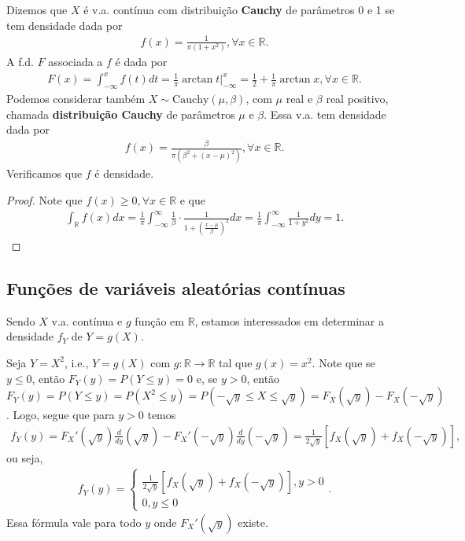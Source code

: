 \documentclass[../Notas.tex]{subfiles}
\begin{document}
\begin{example}
Dizemos que $X$ é v.a. contínua com distribuição \textbf{Cauchy} de parâmetros 0 e 1 se tem densidade dada por
\begin{align*}
    f(x) = \frac{1}{\pi(1+x^2)}, \forall x\in\mathbb{R}.
\end{align*}
A f.d. $F$ associada a $f$ é dada por
\begin{align*}
    F(x) = \int_{-\infty}^x f(t) dt = \frac{1}{\pi}\arctan t\Big|_{-\infty}^{x} = \frac{1}{2} + \frac{1}{\pi}\arctan x, \forall x\in\mathbb{R}.
\end{align*}
Podemos considerar também $X\sim\text{Cauchy}(\mu, \beta)$, com $\mu$ real e $\beta$ real positivo, chamada \textbf{distribuição Cauchy} de parâmetros $\mu$ e $\beta$. Essa v.a. tem densidade dada por
\begin{align*}
    f(x) = \frac{\beta}{\pi(\beta^2 + (x-\mu)^2)}, \forall x\in\mathbb{R}.
\end{align*}
Verificamos que $f$ é densidade.
\begin{proof}
Note que $f(x) \geq 0, \forall x\in\mathbb{R}$ e que
\begin{align*}
    \int_{\mathbb{R}} f(x) dx = \frac{1}{\pi}\int_{-\infty}^{\infty} \frac{1}{\beta}\cdot\frac{ 1 }{ 1 + \left( \frac{x-\mu}{\beta} \right)^2 } dx = \frac{1}{\pi}\int_{-\infty}^{\infty} \frac{1}{1+y^2} dy = 1.
\end{align*}
\end{proof}
\end{example}

\subsection{Funções de variáveis aleatórias contínuas}
Sendo $X$ v.a. contínua e $g$ função em $\mathbb{R}$, estamos interessados em determinar a densidade $f_Y$ de $Y = g(X)$.

\begin{example}
Seja $Y = X^2$, i.e., $Y = g(X)$ com $g:\mathbb{R}\to\mathbb{R}$ tal que $g(x) = x^2$. Note que se $y\leq 0$, então $F_Y(y) = P(Y\leq y) = 0$ e, se $y>0$, então $F_Y(y) = P(Y\leq y) = P(X^2\leq y) = P(-\sqrt{y} \leq X\leq \sqrt{y}) = F_X(\sqrt{y}) - F_X(-\sqrt{y})$. Logo, segue que para $y>0$ temos
\begin{align*}
    f_Y(y) = F_X'(\sqrt{y})\frac{d}{dy}(\sqrt{y}) - F_X'(-\sqrt{y})\frac{d}{dy}(-\sqrt{y}) = \frac{1}{2\sqrt{y}}[f_X(\sqrt{y}) + f_X(-\sqrt{y})],
\end{align*}
ou seja, 
\begin{align*}
    f_Y(y) = \begin{cases}
    \frac{1}{2\sqrt{y}}[f_X(\sqrt{y}) + f_X(-\sqrt{y})], y > 0 \\
    0, y\leq 0
    \end{cases}.
\end{align*}
Essa fórmula vale para todo $y$ onde $F_X'(\sqrt{y})$ existe.
\end{example}
\end{document}

